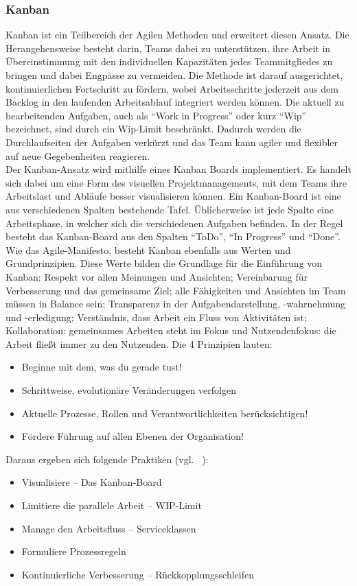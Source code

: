\documentclass[sigconf, nonacm]{acmart}
\begin{document}
\subsubsection{Kanban}
Kanban ist ein Teilbereich der Agilen Methoden und erweitert diesen Ansatz. Die Herangehensweise besteht darin, Teams dabei zu unterstützen, ihre Arbeit in Übereinstimmung mit den individuellen Kapazitäten jedes Teammitgliedes zu bringen und dabei Engpässe zu vermeiden. Die Methode ist darauf ausgerichtet, kontinuierlichen Fortschritt zu fördern, wobei Arbeitsschritte jederzeit aus dem Backlog in den laufenden Arbeitsablauf integriert werden können.
Die aktuell zu bearbeitenden Aufgaben, auch als \enquote{Work in Progress} oder kurz \enquote{Wip} bezeichnet, sind durch ein Wip-Limit beschränkt. Dadurch werden die Durchlaufseiten der Aufgaben verkürzt und das Team kann agiler und flexibler auf neue Gegebenheiten reagieren.~\cite{asana_kanban_13_4_23}
\\
Der Kanban-Ansatz wird mithilfe eines Kanban Boards implementiert. Es handelt sich dabei um eine Form des visuellen Projektmanagements, mit dem Teams ihre Arbeitslast und Abläufe besser visualisieren können. Ein Kanban-Board ist eine aus verschiedenen Spalten bestehende Tafel. Üblicherweise ist jede Spalte eine Arbeitsphase, in welcher sich die verschiedenen Aufgaben befinden. In der Regel besteht das Kanban-Board aus den Spalten \enquote{ToDo}, \enquote{In Progress} und \enquote{Done}.
Wie das Agile-Manifesto, besteht Kanban ebenfalls aus Werten und Grundprinzipien.
Diese Werte bilden die Grundlage für die Einführung von Kanban: Respekt vor allen Meinungen und Ansichten; Vereinbarung für Verbesserung und das gemeinsame Ziel; alle Fähigkeiten und Ansichten im Team müssen in Balance sein; Transparenz in der Aufgabendarstellung, -wahrnehmung und -erledigung; Verständnis, dass Arbeit ein Fluss von Aktivitäten ist; Kollaboration: gemeinsames Arbeiten steht im Fokus und Nutzendenfokus: die Arbeit fließt immer zu den Nutzenden.
Die 4 Prinzipien lauten:
\begin{itemize}
    \item  Beginne mit dem, was du gerade tust!
    \item Schrittweise, evolutionäre Veränderungen verfolgen
    \item Aktuelle Prozesse, Rollen und Verantwortlichkeiten berücksichtigen!
    \item Fördere Führung auf allen Ebenen der Organisation!
\end{itemize}
Daraus ergeben sich folgende Praktiken (vgl. ~\cite{noauthor_organisationshandbuch_nodate}):
\begin{itemize}
\item Visualisiere – Das Kanban-Board
\item Limitiere die parallele Arbeit – WIP-Limit
\item Manage den Arbeitsfluss – Serviceklassen
\item Formuliere Prozessregeln
\item Kontinuierliche Verbesserung – Rückkopplungsschleifen
\end{itemize}
\end{document}

